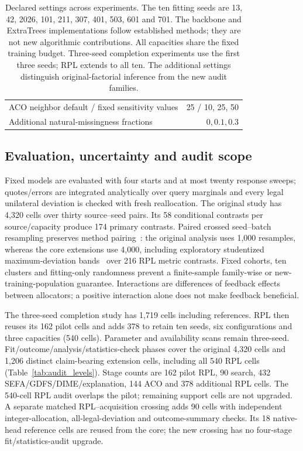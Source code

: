 \documentclass[11pt]{article}
\begin{document}
\begin{table}[htbp]
\begin{tabular}{lr}
ACO neighbor default / fixed sensitivity values & 25 / 10, 25, 50\\
Additional natural-missingness fractions & $0,0.1,0.3$\\\bottomrule
\end{tabular}
\caption{Declared settings across experiments. The ten fitting seeds are
13, 42, 2026, 101, 211, 307, 401, 503, 601 and 701. The backbone and
ExtraTrees implementations follow established methods; they are not new
algorithmic contributions. All capacities share the fixed training budget. Three-seed completion experiments use the first three seeds; RPL extends to all ten. The additional settings distinguish original-factorial inference from the new audit families.}
\label{tab:settings}\end{table}
\subsection{Evaluation, uncertainty and audit scope}
Fixed models are evaluated with four starts and at most twenty response sweeps;
quotes/errors are integrated analytically over query marginals and every legal
unilateral deviation is checked with fresh reallocation. The original study
has 4,320 cells over thirty source--seed pairs. Its 58 conditional contrasts
per source/capacity produce 174 primary contrasts. Paired crossed seed--batch
resampling preserves method pairing~\cite{pigeonhole}: the original analysis
uses 1,000 resamples, whereas the core extensions use 4,000, including
exploratory studentized maximum-deviation bands~\cite{romanowolf} over 216
RPL metric contrasts. Fixed cohorts, ten clusters and fitting-only randomness
prevent a finite-sample family-wise or new-training-population guarantee.
Interactions are differences of feedback effects between allocators; a positive
interaction alone does not make feedback beneficial.

The three-seed completion study has 1,719 cells including references. RPL then
reuses its 162 pilot cells and adds 378 to retain ten seeds, six configurations
and three capacities (540 cells). Parameter and availability scans remain
three-seed. Fit/outcome/analysis/statistics-check phases cover the original
4,320 cells and 1,206 distinct claim-bearing extension cells, including all
540 RPL cells (Table~\ref{tab:audit_levels}). Stage counts are 162 pilot RPL, 90 search, 432 SEFA/GDFS/DIME/explanation,
144 ACO and 378 additional RPL cells. The 540-cell RPL audit overlaps the
pilot; remaining support cells are not upgraded. A separate matched
RPL--acquisition crossing adds 90 cells with independent integer-allocation,
all-legal-deviation and outcome-summary checks. Its 18 native-head reference
cells are reused from the core; the new crossing has no four-stage
fit/statistics-audit upgrade.
\end{document}
